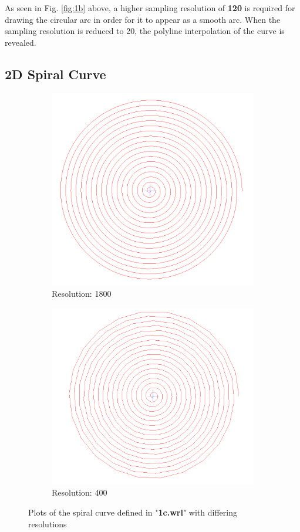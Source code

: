 \documentclass[acmlarge,nonacm=true]{acmart}
\begin{document}
As seen in Fig. \ref{fig:1b} above, a higher sampling resolution of \textbf{120} is required for drawing the circular arc in order for
it to appear as a smooth arc. When the sampling resolution is reduced to 20, the polyline interpolation of the curve is revealed.



\subsection{2D Spiral Curve}
\begin{figure}[H]
	\begin{subfigure}{.4\textwidth}
	  \centering
	  \includegraphics[width=.8\linewidth]{fig/1c1800}
	  \caption{Resolution: 1800}
	\end{subfigure}%
	\begin{subfigure}{.4\textwidth}
	  \centering
	  \includegraphics[width=.8\linewidth]{fig/1c400}
	  \caption{Resolution: 400}
	  \label{fig:1cb}
	\end{subfigure}
	\caption{Plots of the spiral curve defined in "\textbf{1c.wrl}" with differing resolutions}
	\label{fig:1c}
\end{figure}
\end{document}
